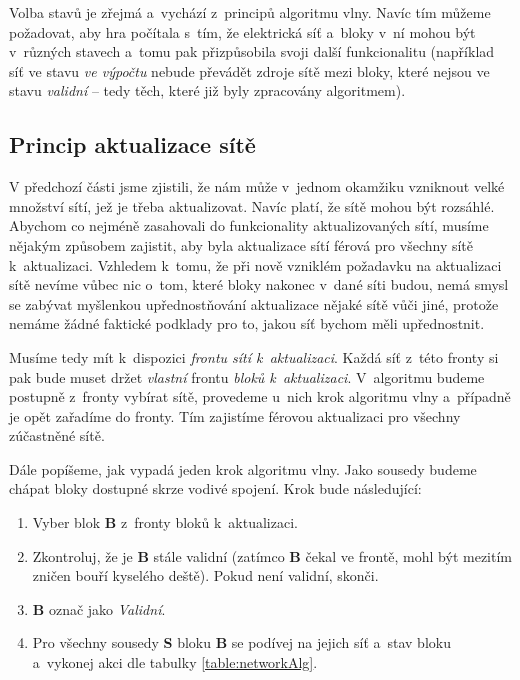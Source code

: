 Volba stavů je zřejmá a~vychází z~principů algoritmu vlny. Navíc tím můžeme požadovat, aby hra počítala s~tím, že elektrická síť a~bloky v~ní mohou být v~různých stavech a~tomu pak přizpůsobila svoji další funkcionalitu (například síť ve stavu \textit{ve výpočtu} nebude převádět zdroje sítě mezi bloky, které nejsou ve stavu \textit{validní} -- tedy těch, které již byly zpracovány algoritmem).

\subsection{Princip aktualizace sítě}

V předchozí části jsme zjistili, že nám může v~jednom okamžiku vzniknout velké množství sítí, jež je třeba aktualizovat. Navíc platí, že sítě mohou být rozsáhlé. Abychom co nejméně zasahovali do funkcionality aktualizovaných sítí, musíme nějakým způsobem zajistit, aby byla aktualizace sítí férová pro všechny sítě k~aktualizaci. Vzhledem k~tomu, že při nově vzniklém požadavku na aktualizaci sítě nevíme vůbec nic o~tom, které bloky nakonec v~dané síti budou, nemá smysl se zabývat myšlenkou upřednostňování aktualizace nějaké sítě vůči jiné, protože nemáme žádné faktické podklady pro to, jakou síť bychom měli upřednostnit.

Musíme tedy mít k~dispozici \textit{frontu sítí k~aktualizaci}. Každá síť z~této fronty si pak bude muset držet \textit{vlastní} frontu \textit{bloků k~aktualizaci}. V~algoritmu budeme postupně z~fronty vybírat sítě, provedeme u~nich krok algoritmu vlny a~případně je opět zařadíme do fronty. Tím zajistíme férovou aktualizaci pro všechny zúčastněné sítě.

Dále popíšeme, jak vypadá jeden krok algoritmu vlny. Jako sousedy budeme chápat bloky dostupné skrze vodivé spojení. Krok bude následující:

\begin{enumerate}
	\item Vyber blok \textbf{B} z~fronty bloků k~aktualizaci.
	\item Zkontroluj, že je \textbf{B} stále validní (zatímco \textbf{B} čekal ve frontě, mohl být mezitím zničen bouří kyselého deště). Pokud není validní, skonči.
	\item \textbf{B} označ jako \textit{Validní}.
	\item Pro všechny sousedy \textbf{S} bloku \textbf{B} se podívej na jejich síť a~stav bloku a~vykonej akci dle tabulky \ref{table:networkAlg}.
\end{enumerate}


